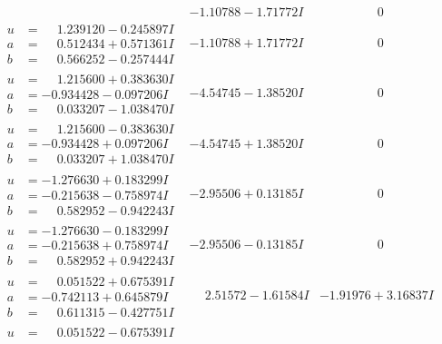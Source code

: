 \documentclass[1p]{elsarticle_modified}
\theoremstyle{definition}
\begin{document}
$$\begin{array}{c|c|c}
 & -1.10788 - 1.71772 I & \phantom{-0.000000 } 0 \\ \hline\begin{aligned}
u &= \phantom{-}1.239120 - 0.245897 I \\
a &= \phantom{-}0.512434 + 0.571361 I \\
b &= \phantom{-}0.566252 - 0.257444 I\end{aligned}
 & -1.10788 + 1.71772 I & \phantom{-0.000000 } 0 \\ \hline\begin{aligned}
u &= \phantom{-}1.215600 + 0.383630 I \\
a &= -0.934428 - 0.097206 I \\
b &= \phantom{-}0.033207 - 1.038470 I\end{aligned}
 & -4.54745 - 1.38520 I & \phantom{-0.000000 } 0 \\ \hline\begin{aligned}
u &= \phantom{-}1.215600 - 0.383630 I \\
a &= -0.934428 + 0.097206 I \\
b &= \phantom{-}0.033207 + 1.038470 I\end{aligned}
 & -4.54745 + 1.38520 I & \phantom{-0.000000 } 0 \\ \hline\begin{aligned}
u &= -1.276630 + 0.183299 I \\
a &= -0.215638 - 0.758974 I \\
b &= \phantom{-}0.582952 - 0.942243 I\end{aligned}
 & -2.95506 + 0.13185 I & \phantom{-0.000000 } 0 \\ \hline\begin{aligned}
u &= -1.276630 - 0.183299 I \\
a &= -0.215638 + 0.758974 I \\
b &= \phantom{-}0.582952 + 0.942243 I\end{aligned}
 & -2.95506 - 0.13185 I & \phantom{-0.000000 } 0 \\ \hline\begin{aligned}
u &= \phantom{-}0.051522 + 0.675391 I \\
a &= -0.742113 + 0.645879 I \\
b &= \phantom{-}0.611315 - 0.427751 I\end{aligned}
 & \phantom{-}2.51572 - 1.61584 I & -1.91976 + 3.16837 I \\ \hline\begin{aligned}
u &= \phantom{-}0.051522 - 0.675391 I \\

\end{aligned}
\end{array}$$
\end{document}
